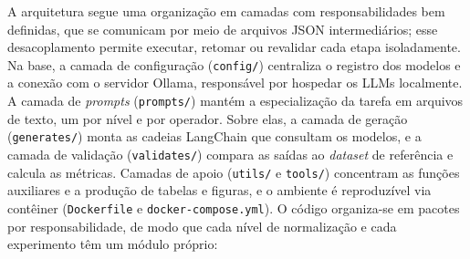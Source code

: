 A arquitetura segue uma organização em camadas com responsabilidades bem definidas, que se comunicam por meio de arquivos JSON intermediários; esse desacoplamento permite executar, retomar ou revalidar cada etapa isoladamente. Na base, a camada de configuração (\texttt{config/}) centraliza o registro dos modelos e a conexão com o servidor Ollama, responsável por hospedar os LLMs localmente. A camada de \textit{prompts} (\texttt{prompts/}) mantém a especialização da tarefa em arquivos de texto, um por nível e por operador. Sobre elas, a camada de geração (\texttt{generates/}) monta as cadeias LangChain que consultam os modelos, e a camada de validação (\texttt{validates/}) compara as saídas ao \textit{dataset} de referência e calcula as métricas. Camadas de apoio (\texttt{utils/} e \texttt{tools/}) concentram as funções auxiliares e a produção de tabelas e figuras, e o ambiente é reproduzível via contêiner (\texttt{Dockerfile} e \texttt{docker-compose.yml}). O código organiza-se em pacotes por responsabilidade, de modo que cada nível de normalização e cada experimento têm um módulo próprio:

